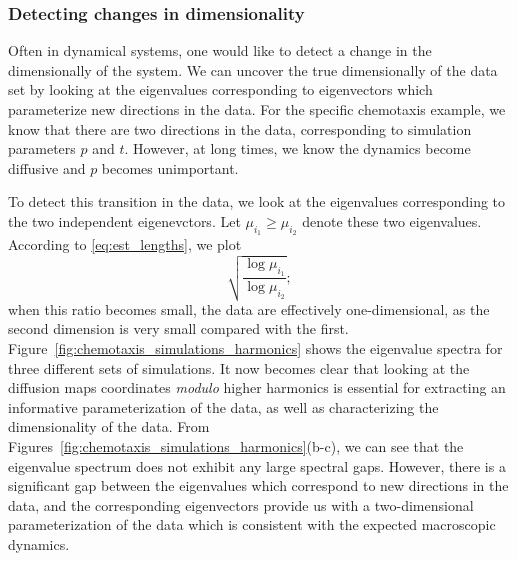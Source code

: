 \documentclass[preprint]{elsarticle}
\begin{document}
\subsubsection{Detecting changes in dimensionality}

Often in dynamical systems, one would like to detect a change in the dimensionally of the system. 
%
We can uncover the true dimensionally of the data set by looking at the eigenvalues corresponding to eigenvectors which parameterize new directions in the data. 
%
For the specific chemotaxis example, we know that there are two directions in the data, corresponding to simulation parameters $p$ and $t$. 
%
However, at long times, we know the dynamics become diffusive and $p$ becomes unimportant. 

To detect this transition in the data, we look at the eigenvalues corresponding to the two independent eigenevctors. 
%
Let $\mu_{i_1} \ge \mu_{i_2}$ denote these two eigenvalues. 
%
According to \eqref{eq:est_lengths}, we plot  
\begin{equation}
 \sqrt{\frac{\log \mu_{i_1}}{\log \mu_{i_2}}} ;
\end{equation}
when this ratio becomes small, the data are effectively one-dimensional, as the second dimension is very small compared with the first. 
%
Figure~\ref{fig:chemotaxis_simulations_harmonics} shows the eigenvalue spectra for three different sets of simulations. 
%
It now becomes clear that looking at the diffusion maps coordinates {\em modulo} higher harmonics is essential for extracting an informative parameterization of the data, as well as characterizing the dimensionality of the data. 
%
From Figures~\ref{fig:chemotaxis_simulations_harmonics}(b-c), we can see that the eigenvalue spectrum does not exhibit any large spectral gaps.
%
However, there is a significant gap between the eigenvalues which correspond to new directions in the data, and the corresponding eigenvectors provide us with a two-dimensional parameterization of the data which is consistent with the expected macroscopic dynamics. 
\end{document}
